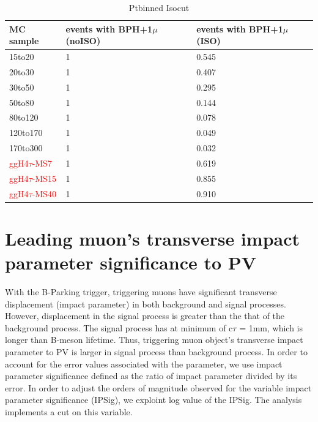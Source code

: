 \begin{tiny}
    \begin{table}
  \centering
\begin{tabular}{|p{3cm}|p{2cm}|p{2cm}|}
\hline
MC sample & events with BPH+1$\mu$ (noISO) & events with BPH+1$\mu$ (ISO) \\
\hline
 15to20 & 1 & 0.545 \\
 \hline
 20to30 & 1 & 0.407 \\
\hline
 30to50 & 1 & 0.295 \\
\hline
 50to80 & 1 & 0.144 \\
\hline
 80to120 & 1 & 0.078 \\
\hline
120to170 & 1 & 0.049 \\
\hline
170to300 & 1 & 0.032 \\
\hline
\textcolor{red}{ggH4$\tau$-MS7}& 1 & 0.619 \\
\hline
\textcolor{red}{ggH4$\tau$-MS15} & 1 & 0.855 \\
\hline
\textcolor{red}{ggH4$\tau$-MS40} & 1 & 0.910 \\
 \hline
    \end{tabular}
    \caption{Ptbinned Isocut}
    \end{table}
\end{tiny}    


\section{Leading muon's transverse impact parameter significance to PV}\label{ref:muIP}
With the B-Parking trigger, triggering muons have significant transverse displacement (impact parameter) in both background and signal processes.
However, displacement in the signal process is greater than the that of the background process.
The signal process has at minimum of c$\tau$ = 1mm, which is longer than B-meson lifetime.
Thus, triggering muon object's transverse impact parameter to PV is larger in signal process than background process.
In order to account for the error values associated with the parameter, we use impact parameter significance defined as the ratio of impact parameter divided by its error.
In order to adjust the orders of magnitude observed for the variable impact parameter significance (IPSig), we exploint log value of the IPSig.
The analysis implements a cut on this variable.


